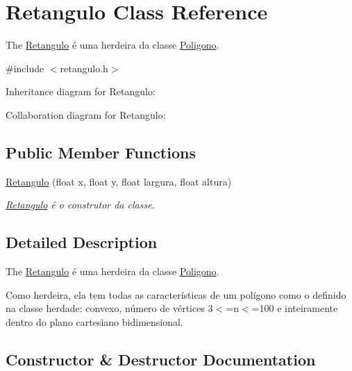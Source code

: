 \hypertarget{class_retangulo}{}\section{Retangulo Class Reference}
\label{class_retangulo}


The \mbox{\hyperlink{class_retangulo}{Retangulo}} é uma herdeira da classe \mbox{\hyperlink{class_poligono}{Poligono}}.  




{\ttfamily \#include $<$retangulo.\+h$>$}



Inheritance diagram for Retangulo\+:


Collaboration diagram for Retangulo\+:
\subsection*{Public Member Functions}
\begin{DoxyCompactItemize}
\item 
\mbox{\hyperlink{class_retangulo_acca1dd211eefc8dc04658c943c0d1122}{Retangulo}} (float x, float y, float largura, float altura)
\begin{DoxyCompactList}\small\item\em \mbox{\hyperlink{class_retangulo}{Retangulo}} é o construtor da classe. \end{DoxyCompactList}\end{DoxyCompactItemize}


\subsection{Detailed Description}
The \mbox{\hyperlink{class_retangulo}{Retangulo}} é uma herdeira da classe \mbox{\hyperlink{class_poligono}{Poligono}}. 

Como herdeira, ela tem todas as características de um polígono como o definido na classe herdade\+: convexo, número de vértices 3$<$=n$<$=100 e inteiramente dentro do plano cartesiano bidimensional. 

\subsection{Constructor \& Destructor Documentation}
\mbox{\label{class_retangulo_acca1dd211eefc8dc04658c943c0d1122}} 

